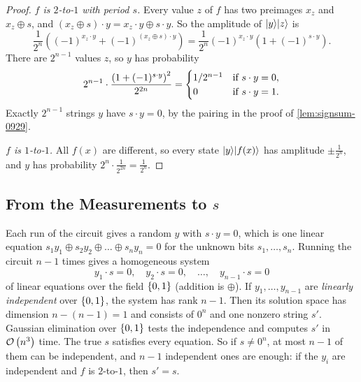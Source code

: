 \begin{proof}
    \emph{$f$ is $2$-to-$1$ with period $s$.} Every value $z$ of $f$ has two preimages $x_z$ and
    $x_z \oplus s$, and $(x_z \oplus s) \cdot y = x_z \cdot y \oplus s \cdot y$. So the amplitude of
    $\lvert y \rangle\lvert z \rangle$ is
    \[\frac{1}{2^n} \left((-1)^{x_z \cdot y} + (-1)^{(x_z \oplus s) \cdot y}\right)
        = \frac{1}{2^n} (-1)^{x_z \cdot y} \left(1 + (-1)^{s \cdot y}\right).\]
    There are $2^{n-1}$ values $z$, so $y$ has probability
    \[2^{n-1} \cdot \frac{\left(1 + (-1)^{s \cdot y}\right)^2}{2^{2n}}
        = \begin{cases}
            1/2^{n-1} & \text{if } s \cdot y = 0, \\
            0                  & \text{if } s \cdot y = 1.
        \end{cases}\]
    Exactly $2^{n-1}$ strings $y$ have $s \cdot y = 0$, by the pairing in the proof of
    \cref{lem:signsum-0929}.

    \emph{$f$ is $1$-to-$1$.} All $f(x)$ are different, so every state $\lvert y \rangle\lvert f(x) \rangle$ has
    amplitude $\pm \frac{1}{2^n}$, and $y$ has probability $2^n \cdot \frac{1}{2^{2n}} = \frac{1}{2^n}$.
\end{proof}

\subsection{From the Measurements to \texorpdfstring{$s$}{s}}

Each run of the circuit gives a random $y$ with $s \cdot y = 0$, which is one linear equation
$s_1 y_1 \oplus s_2 y_2 \oplus \dots \oplus s_n y_n = 0$ for the unknown bits $s_1, \dots, s_n$. Running
the circuit $n - 1$ times gives a homogeneous system
\[y_1 \cdot s = 0, \quad y_2 \cdot s = 0, \quad \dots, \quad y_{n-1} \cdot s = 0\]
of linear equations over the field $\left\lbrace0,1\right\rbrace$ (addition is $\oplus$). If $y_1, \dots, y_{n-1}$ are
\emph{linearly independent} over $\left\lbrace0,1\right\rbrace$, the system has rank $n - 1$. Then its solution space has
dimension $n - (n-1) = 1$ and consists of $0^n$ and one nonzero string $s'$. Gaussian elimination over
$\left\lbrace0,1\right\rbrace$ tests the independence and computes $s'$ in $\mathcal{O}\left(n^3\right)$ time. The true $s$ satisfies every
equation. So if $s \neq 0^n$, at most $n - 1$ of them can be independent, and $n - 1$ independent ones
are enough: if the $y_i$ are independent and $f$ is $2$-to-$1$, then $s' = s$.

